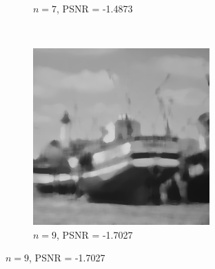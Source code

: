 \documentclass{article}
\begin{document}
\begin{enumerate}[label=(\alph*)]
\begin{figure}[!htb]
\begin{subfigure}[b]{0.3\textwidth}
            \caption{$n = 7$, PSNR = -1.4873}
        \end{subfigure}
        ~
        \begin{subfigure}[b]{0.3\textwidth}
            \includegraphics[width=\textwidth]{img/RS9.png}
            \caption{$n = 9$, PSNR = -1.7027}
        \end{subfigure}
        
    

\end{figure}
\end{enumerate}
\end{document}
